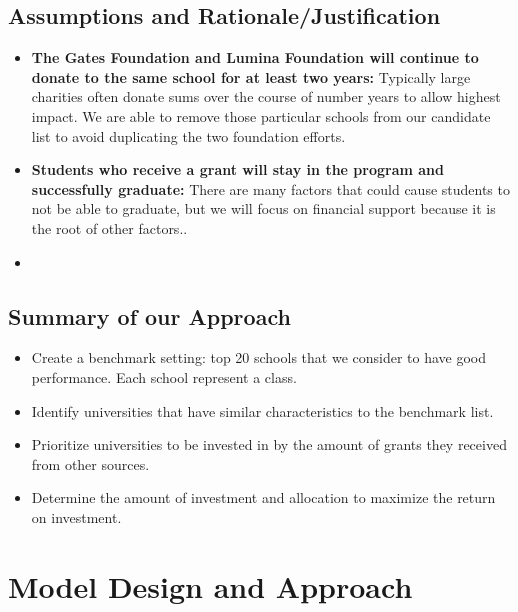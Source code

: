 \documentclass[12pt]{scrartcl}
\begin{document}
	\subsection{Assumptions and Rationale/Justification}
	\begin{itemize}
		\item \textbf{The Gates Foundation and Lumina Foundation will continue to donate to the same school for at least two years:} Typically large charities often donate sums over the course of number years to allow highest impact. \cite{Conkey} We are able to remove those particular schools from our candidate list to avoid duplicating the two foundation efforts. 
				
		\item \textbf{Students who receive a grant will stay in the program and successfully graduate:} There are many factors that could cause students to not be able to graduate, but we will focus on financial support because it is the root of other factors..\cite{Trom}

		\item \textbf{} 
	\end{itemize}
	
	\subsection{Summary of our Approach}
		\begin{itemize}
		\item Create a benchmark setting: top 20 schools that we consider to have good performance. Each school represent a class.  
		\item Identify universities that have similar characteristics to the benchmark list. 
		\item Prioritize universities to be invested in by the amount of grants they received from other sources.
		\item Determine the amount of investment and allocation to maximize the return on investment. 
		\end{itemize}
				 
\clearpage
\section{Model Design and Approach}
\end{document}
